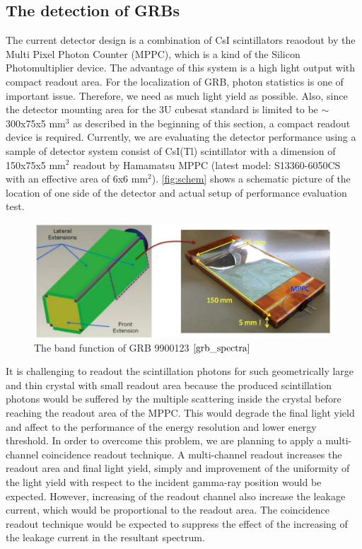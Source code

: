 \documentclass[12pt, a4paper,titlepage]{article}
\numberwithin{equation}{section}
\numberwithin{figure}{section}
\begin{document}
\subsection{The detection of GRBs}

The current detector design is a combination of CsI scintillators reaodout by the Multi Pixel Photon Counter (MPPC), which is a kind of the Silicon Photomultiplier device. The advantage of this system is a high light output with compact readout area. For the localization of GRB, photon statistics is one of important issue. Therefore, we need as much light yield as possible. Also, since the detector mounting area for the 3U cubesat standard is limited to be $\sim$300x75x5 mm$^{3}$ as described in the beginning of this section, a compact readout device is required. Currently, we are evaluating the detector performance using a sample of detector system consist of CsI(Tl) scintillator with a dimension of 150x75x5 mm$^{2}$ readout by Hamamatsu MPPC (latest model: S13360-6050CS with an effective area of 6x6 mm$^{2}$). \ref{fig:schem} shows a schematic picture of the location of one side of the detector and actual setup of performance evaluation test.

\begin{figure}[H]
\centering
\includegraphics[width=130.0mm]{images/scint_on_sate.png}
\caption{The band function of GRB 9900123 $\cite{grb_spectra}$}
\end{figure}

It is challenging to readout the scintillation photons for such geometrically large and thin crystal with small readout area because the produced scintillation photons would be suffered by the multiple scattering inside the crystal before reaching the readout area of the MPPC. This would degrade the final light yield and affect to the performance of the energy resolution and lower energy threshold. In order to overcome this problem, we are planning to apply a multi-channel coincidence readout technique. A multi-channel readout increases the readout area and final light yield, simply and improvement of the uniformity of the light yield with respect to the incident gamma-ray position would be expected. However, increasing of the readout channel also increase the leakage current, which would be proportional to the readout area. The coincidence readout technique would be expected to suppress the effect of the increasing of the leakage current in the resultant spectrum. 
\end{document}

